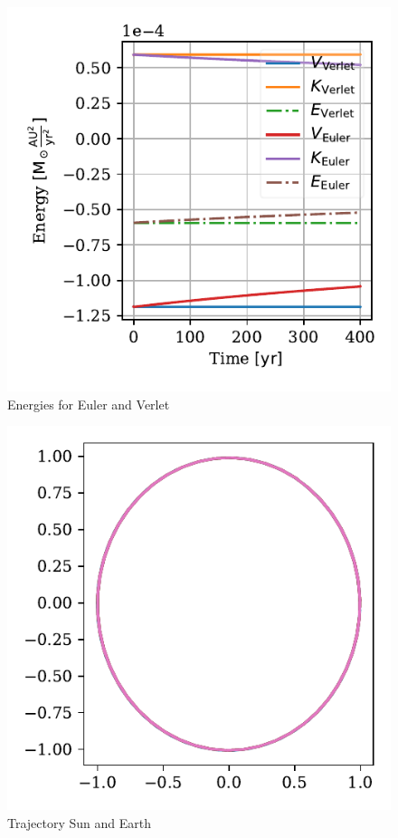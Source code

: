 \documentclass[twocolumn]{aastex62}
\begin{document}
\begin{figure}
\includegraphics[scale=1]{Figures/taskb_energies.pdf}
\caption{Energies for Euler and Verlet}
\label{fig:energy}
\end{figure}

\begin{figure}
\includegraphics[scale=1]{Figures/taskb_trajectories.pdf}
\caption{Trajectory Sun and Earth}
\label{fig:traj}
\end{figure}
\end{document}
